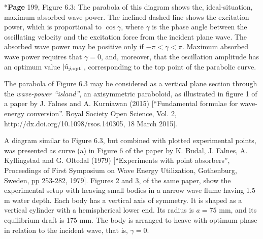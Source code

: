 \documentclass[a4paper,12pt]{article}
\begin{document}
\noindent %
*{\bf Page} 199, Figure 6.3:
\newline 
The parabola of this diagram shows the, ideal-situation, maximum absorbed wave power. The inclined dashed line shows the excitation power, which is proportional to $\cos \gamma$, where $\gamma$ is the phase angle between the oscillating velocity and the excitation force from the incident plane wave. The absorbed wave power may be positive only if $-\pi < \gamma < \pi$. Maximum absorbed wave power requires that $\gamma = 0$, and, moreover, that the oscillation amplitude has an optimum value $|{\hat u}_{j,\rm opt}|$, corresponding to the top point of the parabolic curve.

%

The parabola of Figure 6.3 may be considered as a vertical plane section through the {\it wave-power ``island''}, an axisymmetric paraboloid, as illustrated in figure 1 of a paper by J. Falnes and A. Kurniawan (2015) [``Fundamental formulae for wave-energy conversion''. Royal Society Open Science, Vol. 2, http://dx.doi.org/10.1098/rsos.140305, 18 March 2015].

A diagram similar to Figure 6.3, but combined with plotted experimental points, was presented  as curve (a) in Figure 6 of the paper by K. Budal, J. Falnes, A. Kyllingstad and G. Oltedal (1979) [``Experiments with point absorbers'', Proceedings of First Symposium on Wave Energy Utilization, Gothenburg, Sweden, pp 253-282, 1979]. Figures 2 and 3, of the same paper, show the experimental setup with heaving small bodies in a narrow wave flume having 1.5 m water depth. %
 Each body has a vertical axis of symmetry. It is shaped as a vertical cylinder with a hemispherical lower end. Its radius is $a = 75$ mm, and its equilibrium draft is 175 mm. The body is arranged to heave with optimum phase in relation to the incident wave, that is, $\gamma \! = \! 0$. %
\end{document}
